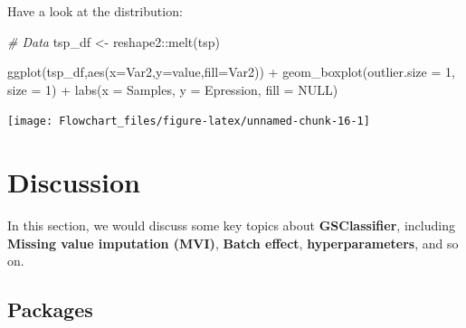 \documentclass[
  12pt,
]{book}
\newenvironment{Shaded}{\begin{snugshade}}{\end{snugshade}}
\newcommand{\AttributeTok}[1]{\textcolor[rgb]{0.77,0.63,0.00}{#1}}
\newcommand{\CommentTok}[1]{\textcolor[rgb]{0.56,0.35,0.01}{\textit{#1}}}
\newcommand{\ConstantTok}[1]{\textcolor[rgb]{0.00,0.00,0.00}{#1}}
\newcommand{\DecValTok}[1]{\textcolor[rgb]{0.00,0.00,0.81}{#1}}
\newcommand{\FunctionTok}[1]{\textcolor[rgb]{0.00,0.00,0.00}{#1}}
\newcommand{\NormalTok}[1]{#1}
\newcommand{\OtherTok}[1]{\textcolor[rgb]{0.56,0.35,0.01}{#1}}
\newcommand{\SpecialCharTok}[1]{\textcolor[rgb]{0.00,0.00,0.00}{#1}}
\newcommand{\StringTok}[1]{\textcolor[rgb]{0.31,0.60,0.02}{#1}}
\begin{document}
Have a look at the distribution:

\begin{Shaded}
\begin{Highlighting}[]

\CommentTok{\# Data}
\NormalTok{tsp\_df }\OtherTok{\textless{}{-}}\NormalTok{ reshape2}\SpecialCharTok{::}\FunctionTok{melt}\NormalTok{(tsp)}

\FunctionTok{ggplot}\NormalTok{(tsp\_df,}\FunctionTok{aes}\NormalTok{(}\AttributeTok{x=}\NormalTok{Var2,}\AttributeTok{y=}\NormalTok{value,}\AttributeTok{fill=}\NormalTok{Var2)) }\SpecialCharTok{+} 
      \FunctionTok{geom\_boxplot}\NormalTok{(}\AttributeTok{outlier.size =} \DecValTok{1}\NormalTok{, }\AttributeTok{size =} \DecValTok{1}\NormalTok{) }\SpecialCharTok{+} 
      \FunctionTok{labs}\NormalTok{(}\AttributeTok{x =} \StringTok{\textquotesingle{}Samples\textquotesingle{}}\NormalTok{,}
           \AttributeTok{y =} \StringTok{\textquotesingle{}Epression\textquotesingle{}}\NormalTok{,}
           \AttributeTok{fill =} \ConstantTok{NULL}\NormalTok{) }
\end{Highlighting}
\end{Shaded}

\begin{center}\texttt{[image: Flowchart\_files/figure-latex/unnamed-chunk-16-1]} \end{center}

\hypertarget{discussion}{%
\chapter{Discussion}\label{discussion}}

In this section, we would discuss some key topics about \textbf{GSClassifier}, including \textbf{Missing value imputation (MVI)}, \textbf{Batch effect}, \textbf{hyperparameters}, and so on.

\hypertarget{packages-1}{%
\section{Packages}\label{packages-1}}
\end{document}
